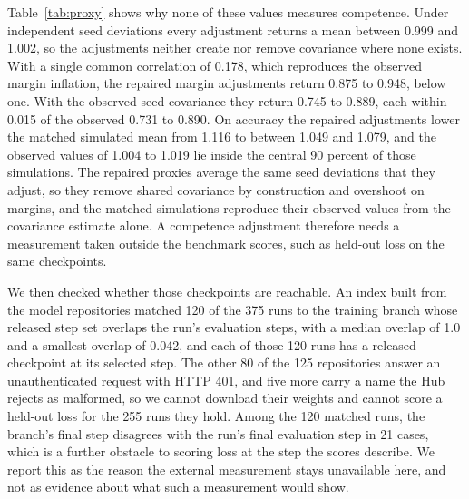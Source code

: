 Table~\ref{tab:proxy} shows why none of these values measures competence. Under independent seed deviations every adjustment returns a mean between 0.999 and 1.002, so the adjustments neither create nor remove covariance where none exists. With a single common correlation of 0.178, which reproduces the observed margin inflation, the repaired margin adjustments return 0.875 to 0.948, below one. With the observed seed covariance they return 0.745 to 0.889, each within 0.015 of the observed 0.731 to 0.890. On accuracy the repaired adjustments lower the matched simulated mean from 1.116 to between 1.049 and 1.079, and the observed values of 1.004 to 1.019 lie inside the central 90 percent of those simulations. The repaired proxies average the same seed deviations that they adjust, so they remove shared covariance by construction and overshoot on margins, and the matched simulations reproduce their observed values from the covariance estimate alone. A competence adjustment therefore needs a measurement taken outside the benchmark scores, such as held-out loss on the same checkpoints.

We then checked whether those checkpoints are reachable. An index built from the model repositories matched 120 of the 375 runs to the training branch whose released step set overlaps the run's evaluation steps, with a median overlap of 1.0 and a smallest overlap of 0.042, and each of those 120 runs has a released checkpoint at its selected step. The other 80 of the 125 repositories answer an unauthenticated request with HTTP 401, and five more carry a name the Hub rejects as malformed, so we cannot download their weights and cannot score a held-out loss for the 255 runs they hold. Among the 120 matched runs, the branch's final step disagrees with the run's final evaluation step in 21 cases, which is a further obstacle to scoring loss at the step the scores describe. We report this as the reason the external measurement stays unavailable here, and not as evidence about what such a measurement would show.

